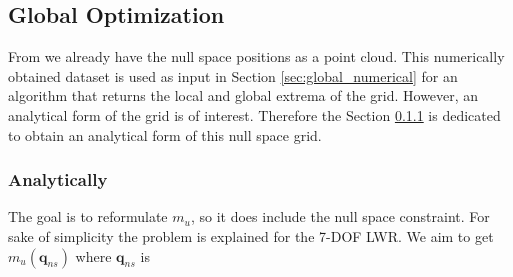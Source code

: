%
%
%








\subsection{Global Optimization}
\label{ch:globaloptimization}
\label{sec:globaloptimization}


From \cite{fabianthesis} we already have the null space positions as a point cloud. This numerically obtained dataset is used as input in Section \ref{sec:global_numerical} for an algorithm that returns the local and global extrema of the grid. However, an analytical form of the grid is of interest. Therefore the Section \ref{sec:global_analytical} is dedicated to obtain an analytical form  of this null space grid.




\subsubsection{Analytically}
\label{sec:global_analytical}



\label{subsec:imposing_ns_constraint}


The goal is to reformulate $m_u$, so it does include the null space constraint. 
For sake of simplicity the problem is explained for the 7-DOF LWR.  We aim to get $m_u(\mathbf{q}_{ns})$ where $\mathbf{q}_{ns}$ is


